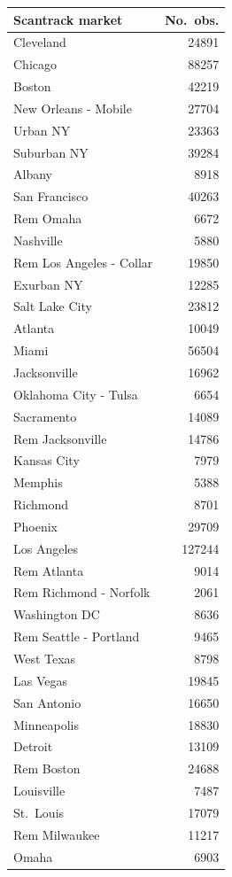 \documentclass[
]{article}
\begin{document}
\begin{longtable}[]{@{}lr@{}}
\toprule\noalign{}
Scantrack market & No.~obs. \\
\midrule\noalign{}
\endhead
\bottomrule\noalign{}
\endlastfoot
Cleveland & 24891 \\
Chicago & 88257 \\
Boston & 42219 \\
New Orleans - Mobile & 27704 \\
Urban NY & 23363 \\
Suburban NY & 39284 \\
Albany & 8918 \\
San Francisco & 40263 \\
Rem Omaha & 6672 \\
Nashville & 5880 \\
Rem Los Angeles - Collar & 19850 \\
Exurban NY & 12285 \\
Salt Lake City & 23812 \\
Atlanta & 10049 \\
Miami & 56504 \\
Jacksonville & 16962 \\
Oklahoma City - Tulsa & 6654 \\
Sacramento & 14089 \\
Rem Jacksonville & 14786 \\
Kansas City & 7979 \\
Memphis & 5388 \\
Richmond & 8701 \\
Phoenix & 29709 \\
Los Angeles & 127244 \\
Rem Atlanta & 9014 \\
Rem Richmond - Norfolk & 2061 \\
Washington DC & 8636 \\
Rem Seattle - Portland & 9465 \\
West Texas & 8798 \\
Las Vegas & 19845 \\
San Antonio & 16650 \\
Minneapolis & 18830 \\
Detroit & 13109 \\
Rem Boston & 24688 \\
Louisville & 7487 \\
St.~Louis & 17079 \\
Rem Milwaukee & 11217 \\
Omaha & 6903 \\

\end{longtable}
\end{document}
